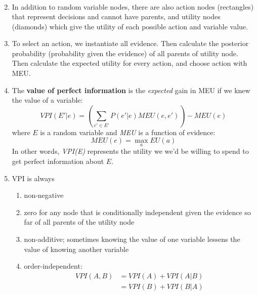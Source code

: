 \documentclass[10pt]{article}
\begin{document}
\begin{multicols}{2}
\begin{addmargin}[0.8em]{0.5em}
\begin{enumerate}[label=(\alph*)]
\begin{align*}
        \end{align*}
        \item In addition to random variable nodes, there are also action nodes (rectangles) that represent decisions and cannot have parents, and utility nodes (diamonds) which give the utility of each possible action and variable value.
        \item To select an action, we instantiate all evidence. Then calculate the posterior probability (probability given the evidence) of all parents of utility node. Then calculate the expected utility for every action, and choose action with MEU.
        \item The \textbf{value of perfect information} is the \textit{expected} gain in MEU if we knew the value of a variable:
        $$\textit{VPI}(E'|e)=\left( \sum_{e' \in E'} P(e'|e)\textit{MEU}(e,e') \right) - \textit{MEU}(e)$$
        where $E$ is a random variable and \textit{MEU} is a function of evidence:
        $$\textit{MEU}(e)=\max_{a}\textit{EU}(a)$$
        In other words, \textit{VPI(E)} represents the utility we we'd be willing to spend to get perfect information about $E$.
        \item VPI is always 
        \begin{enumerate}
            \item non-negative
            \item zero for any node that is conditionally independent given the evidence so far of all parents of the utility node
            \item non-additive; sometimes knowing the value of one variable lessens the value of knowing another variable
            \item order-independent: 
            \begin{align*}
     \textit{VPI}(A,B)&=\textit{VPI}(A)+\textit{VPI}(A|B) \\ &= \textit{VPI}(B)+\textit{VPI}(B|A)
            \end{align*}
        \end{enumerate}
    \end{enumerate}

\end{addmargin}
\end{multicols}
\end{document}
